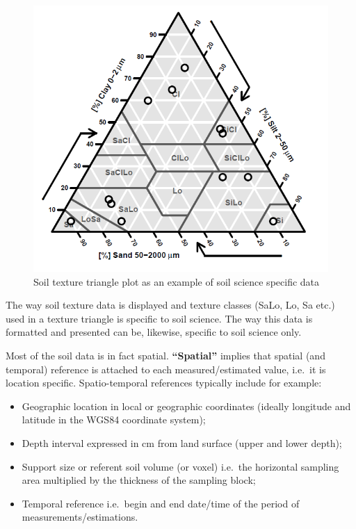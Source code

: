 \documentclass[10pt,b5paper,]{book}
\providecommand{\tightlist}{%
  \setlength{\itemsep}{0pt}\setlength{\parskip}{0pt}}
\theoremstyle{definition}
\theoremstyle{definition}
\theoremstyle{definition}
\theoremstyle{remark}
\begin{document}
\begin{figure}
\centering
\includegraphics{images/Data_sharing_triangle.png}
\caption{Soil texture triangle plot as an example of soil science
specific data}
\end{figure}

The way soil texture data is displayed and texture classes (SaLo, Lo, Sa
etc.) used in a texture triangle is specific to soil science. The way
this data is formatted and presented can be, likewise, specific to soil
science only.

Most of the soil data is in fact spatial. \textbf{``Spatial''} implies
that spatial (and temporal) reference is attached to each
measured/estimated value, i.e.~it is location specific. Spatio-temporal
references typically include for example:

\begin{itemize}
\tightlist
\item
  Geographic location in local or geographic coordinates (ideally
  longitude and latitude in the WGS84 coordinate system);
\item
  Depth interval expressed in cm from land surface (upper and lower
  depth);
\item
  Support size or referent soil volume (or voxel) i.e.~the horizontal
  sampling area multiplied by the thickness of the sampling block;
\item
  Temporal reference i.e.~begin and end date/time of the period of
  measurements/estimations.
\end{itemize}
\end{document}
